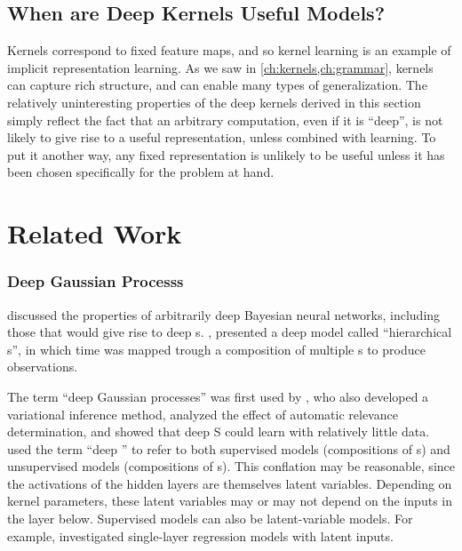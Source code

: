 \subsection{When are Deep Kernels Useful Models?}

Kernels correspond to fixed feature maps, and so kernel learning is an example of implicit representation learning. %
As we saw in \cref{ch:kernels,ch:grammar}, kernels can capture rich structure, and can enable many types of generalization.
The relatively uninteresting properties of the deep kernels derived in this section simply reflect the fact that an arbitrary computation, even if it is ``deep'', is not likely to give rise to a useful representation, unless combined with learning.
To put it another way, any fixed representation is unlikely to be useful unless it has been chosen specifically for the problem at hand.






\section{Related Work}

\subsubsection{Deep Gaussian Processs}
\citet{neal1995bayesian} discussed the properties of arbitrarily deep Bayesian neural networks, including those that would give rise to deep \gp{}s.
\citep{lawrence2007hierarchical}, presented a deep model called ``hierarchical \gplvm{}s'', in which time was mapped trough a composition of multiple \gp{}s to produce observations.

The term ``deep Gaussian processes'' was first used by \citet{damianou2012deep}, who also developed a variational inference method, analyzed the effect of automatic relevance determination, and showed that deep \gp{}S could learn with relatively little data.
%
\citet{damianou2012deep} used the term ``deep \gp{}'' to refer to both supervised models (compositions of \gp{}s) and unsupervised models (compositions of \gplvm{}s).
This conflation may be reasonable, since the activations of the hidden layers are themselves latent variables.
Depending on kernel parameters, these latent variables may or may not depend on the inputs in the layer below.
Supervised models can also be latent-variable models.
For example, \citet{wang2012gaussian} investigated single-layer \gp{} regression models with latent inputs.

